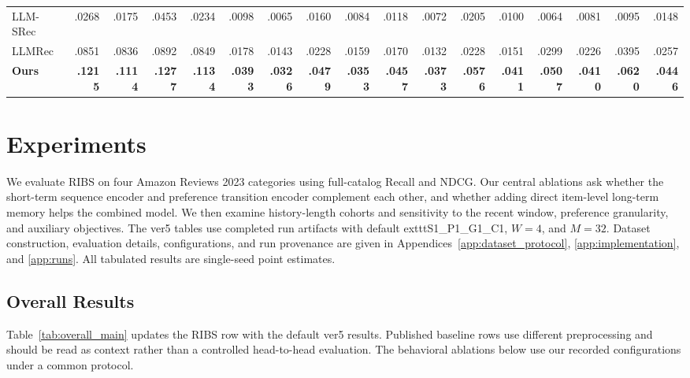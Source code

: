 \documentclass[11pt]{article}
\begin{document}
\begin{table}[t]
{\begin{tabular}{l*{4}{rrrr}}
        LLM-SRec &.0268 & .0175 & .0453 & .0234 & .0098 & .0065 & .0160 & .0084 & .0118 & .0072 & .0205 & .0100 & .0064 & .0081 & .0095 & .0148\\
        LLMRec & .0851 & .0836 & .0892 & .0849 & .0178 & .0143 & .0228 & .0159 & .0170 & .0132 & .0228 & .0151 & .0299 & .0226 & .0395 & .0257 \\
        \midrule
\textbf{Ours} & \textbf{.1215} & \textbf{.1114} & \textbf{.1277} & \textbf{.1134} & \textbf{.0393} & \textbf{.0326} & \textbf{.0479} & \textbf{.0353} & \textbf{.0457} & \textbf{.0373} & \textbf{.0576} & \textbf{.0411} & \textbf{.0507} & \textbf{.0410} & \textbf{.0620} & \textbf{.0446} \\
        \bottomrule
    \end{tabular}%
    }
\end{table}

\section{Experiments}
\label{sec:experiments}
We evaluate RIBS on four Amazon Reviews 2023 categories using full-catalog Recall and NDCG. Our central ablations ask whether the short-term sequence encoder and preference transition encoder complement each other, and whether adding direct item-level long-term memory helps the combined model. We then examine history-length cohorts and sensitivity to the recent window, preference granularity, and auxiliary objectives. The ver5 tables use completed run artifacts with default 	exttt{S1\_P1\_G1\_C1}, $W=4$, and $M=32$. Dataset construction, evaluation details, configurations, and run provenance are given in Appendices~\ref{app:dataset_protocol}, \ref{app:implementation}, and \ref{app:runs}. All tabulated results are single-seed point estimates.

\subsection{Overall Results}
Table~\ref{tab:overall_main} updates the RIBS row with the default ver5 results. Published baseline rows use different preprocessing and should be read as context rather than a controlled head-to-head evaluation. The behavioral ablations below use our recorded configurations under a common protocol.
\end{document}
